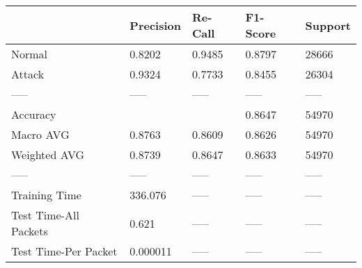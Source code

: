 \begin{tabular}{lllll}
\toprule
{} & Precision & Re-Call & F1-Score & Support \\
\midrule
Normal                &    0.8202 &  0.9485 &   0.8797 &   28666 \\
Attack                &    0.9324 &  0.7733 &   0.8455 &   26304 \\
-----                 &     ----- &   ----- &    ----- &   ----- \\
Accuracy              &           &         &   0.8647 &   54970 \\
Macro AVG             &    0.8763 &  0.8609 &   0.8626 &   54970 \\
Weighted AVG          &    0.8739 &  0.8647 &   0.8633 &   54970 \\
-----                 &     ----- &   ----- &    ----- &   ----- \\
Training Time         &   336.076 &   ----- &    ----- &   ----- \\
Test Time-All Packets &     0.621 &   ----- &    ----- &   ----- \\
Test Time-Per Packet  &  0.000011 &   ----- &    ----- &   ----- \\
\bottomrule
\end{tabular}
